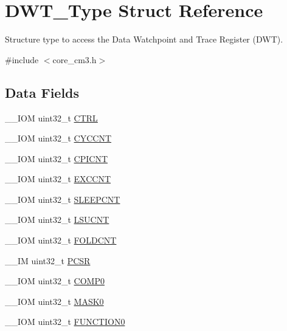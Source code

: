 \hypertarget{struct_d_w_t___type}{}\section{D\+W\+T\+\_\+\+Type Struct Reference}
\label{struct_d_w_t___type}


Structure type to access the Data Watchpoint and Trace Register (D\+WT).  




{\ttfamily \#include $<$core\+\_\+cm3.\+h$>$}

\subsection*{Data Fields}
\begin{DoxyCompactItemize}
\item 
\+\_\+\+\_\+\+I\+OM uint32\+\_\+t \mbox{\hyperlink{struct_d_w_t___type_ac81efc171e9852a36caeb47122bfec5b}{C\+T\+RL}}
\item 
\+\_\+\+\_\+\+I\+OM uint32\+\_\+t \mbox{\hyperlink{struct_d_w_t___type_a14822f5ad3426799332ac537d9293f3c}{C\+Y\+C\+C\+NT}}
\item 
\+\_\+\+\_\+\+I\+OM uint32\+\_\+t \mbox{\hyperlink{struct_d_w_t___type_a29ca657c77928334be08a2e6555be950}{C\+P\+I\+C\+NT}}
\item 
\+\_\+\+\_\+\+I\+OM uint32\+\_\+t \mbox{\hyperlink{struct_d_w_t___type_afe0bbc124e53ad450abc72bfb56bd74f}{E\+X\+C\+C\+NT}}
\item 
\+\_\+\+\_\+\+I\+OM uint32\+\_\+t \mbox{\hyperlink{struct_d_w_t___type_aafa1400cd3168b21652b86599ad3ed83}{S\+L\+E\+E\+P\+C\+NT}}
\item 
\+\_\+\+\_\+\+I\+OM uint32\+\_\+t \mbox{\hyperlink{struct_d_w_t___type_ae886261750c8c90d67a2f276d074e9c3}{L\+S\+U\+C\+NT}}
\item 
\+\_\+\+\_\+\+I\+OM uint32\+\_\+t \mbox{\hyperlink{struct_d_w_t___type_a6324c1fbf6c94f1eaf742d09ad678216}{F\+O\+L\+D\+C\+NT}}
\item 
\+\_\+\+\_\+\+IM uint32\+\_\+t \mbox{\hyperlink{struct_d_w_t___type_a72e52fffe9ac6af0ee15877e2d5dac41}{P\+C\+SR}}
\item 
\+\_\+\+\_\+\+I\+OM uint32\+\_\+t \mbox{\hyperlink{struct_d_w_t___type_a5d0c69187f8abc99ecbde49431cf0050}{C\+O\+M\+P0}}
\item 
\+\_\+\+\_\+\+I\+OM uint32\+\_\+t \mbox{\hyperlink{struct_d_w_t___type_a84089e08ecf14b86f92c727a568ceac4}{M\+A\+S\+K0}}
\item 
\+\_\+\+\_\+\+I\+OM uint32\+\_\+t \mbox{\hyperlink{struct_d_w_t___type_ad3c69d206a52a85165eb7bd8077b0608}{F\+U\+N\+C\+T\+I\+O\+N0}}

\end{DoxyCompactItemize}
